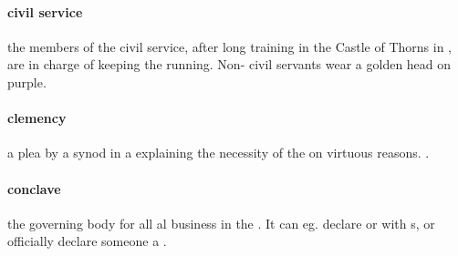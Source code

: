 \paragraph{civil service} the members of the civil service, after long training in the Castle of Thorns in , are in charge of keeping the  running. Non- civil servants wear a golden  head on purple.
\paragraph{clemency} a plea by a synod  in a  explaining the necessity of the  on virtuous reasons. .
\paragraph{conclave} the governing body for all al business in the . It can eg. declare  or  with s, or officially declare someone a .

